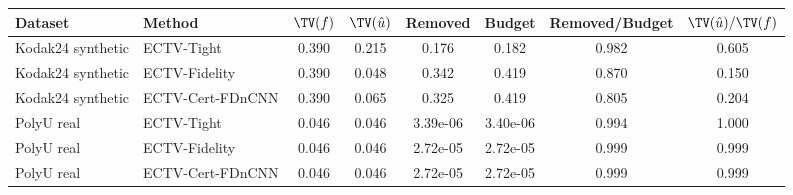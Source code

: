 \begin{tabular}{llcccccc}
\toprule
Dataset & Method & $\TV(f)$ & $\TV(\hat u)$ & Removed & Budget & Removed/Budget & $\TV(\hat u)/\TV(f)$ \\
\midrule
Kodak24 synthetic & ECTV-Tight & 0.390 & 0.215 & 0.176 & 0.182 & 0.982 & 0.605 \\
Kodak24 synthetic & ECTV-Fidelity & 0.390 & 0.048 & 0.342 & 0.419 & 0.870 & 0.150 \\
Kodak24 synthetic & ECTV-Cert-FDnCNN & 0.390 & 0.065 & 0.325 & 0.419 & 0.805 & 0.204 \\
PolyU real & ECTV-Tight & 0.046 & 0.046 & 3.39e-06 & 3.40e-06 & 0.994 & 1.000 \\
PolyU real & ECTV-Fidelity & 0.046 & 0.046 & 2.72e-05 & 2.72e-05 & 0.999 & 0.999 \\
PolyU real & ECTV-Cert-FDnCNN & 0.046 & 0.046 & 2.72e-05 & 2.72e-05 & 0.999 & 0.999 \\
\bottomrule
\end{tabular}
